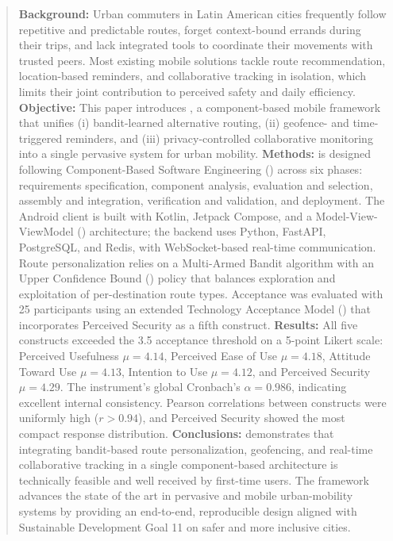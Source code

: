 \documentclass[a4paper,fleqn]{cas-sc}
\begin{document}
	
	\begin{abstract}
		\textbf{Background:} Urban commuters in Latin American cities frequently follow repetitive and predictable routes, forget context-bound errands during their trips, and lack integrated tools to coordinate their movements with trusted peers. Most existing mobile solutions tackle route recommendation, location-based reminders, and collaborative tracking in isolation, which limits their joint contribution to perceived safety and daily efficiency.
		\textbf{Objective:} This paper introduces \RUTAI{}, a component-based mobile framework that unifies (i) bandit-learned alternative routing, (ii) geofence- and time-triggered reminders, and (iii) privacy-controlled collaborative monitoring into a single pervasive system for urban mobility.
		\textbf{Methods:} \RUTAI{} is designed following Component-Based Software Engineering (\CBSE{}) across six phases: requirements specification, component analysis, evaluation and selection, assembly and integration, verification and validation, and deployment. The Android client is built with Kotlin, Jetpack Compose, and a Model-View-ViewModel (\MVVM{}) architecture; the backend uses Python, FastAPI, PostgreSQL, and Redis, with WebSocket-based real-time communication. Route personalization relies on a Multi-Armed Bandit algorithm with an Upper Confidence Bound (\UCB{}) policy that balances exploration and exploitation of per-destination route types. Acceptance was evaluated with 25 participants using an extended Technology Acceptance Model (\TAM{}) that incorporates Perceived Security as a fifth construct.
		\textbf{Results:} All five \TAM{} constructs exceeded the 3.5 acceptance threshold on a 5-point Likert scale: Perceived Usefulness $\mu{=}4.14$, Perceived Ease of Use $\mu{=}4.18$, Attitude Toward Use $\mu{=}4.13$, Intention to Use $\mu{=}4.12$, and Perceived Security $\mu{=}4.29$. The instrument's global Cronbach's $\alpha=0.986$, indicating excellent internal consistency. Pearson correlations between constructs were uniformly high ($r>0.94$), and Perceived Security showed the most compact response distribution.
		\textbf{Conclusions:} \RUTAI{} demonstrates that integrating bandit-based route personalization, geofencing, and real-time collaborative tracking in a single component-based architecture is technically feasible and well received by first-time users. The framework advances the state of the art in pervasive and mobile urban-mobility systems by providing an end-to-end, reproducible design aligned with Sustainable Development Goal 11 on safer and more inclusive cities.
	\end{abstract}
	
\end{document}
